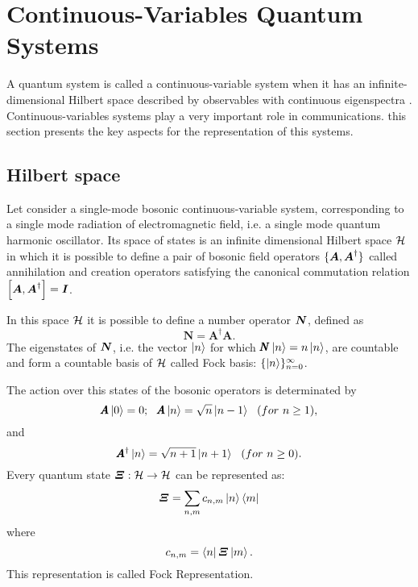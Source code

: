 \section{Continuous-Variables Quantum Systems}
    A quantum system is called a continuous-variable system
    when it has an infinite-dimensional Hilbert space described
    by observables with continuous eigenspectra \cite{ContinuousVar}.
    Continuous-variables systems play a very important role in communications. this
    section presents the key aspects for the representation of this systems.
            
    \subsection{Hilbert space}
        Let consider a single-mode bosonic continuous-variable system, corresponding to a single
        mode radiation of electromagnetic field, i.e. a single mode quantum harmonic oscillator.
        Its space of states is an infinite dimensional Hilbert space $\mathcal{H}$ in which it is possible to define
        a pair of bosonic field operators $\{ \bm{\relax{A}},\bm{\relax{A}}^{\dagger}\}$ called annihilation
        and creation operators \cite{ContinuousVar} satisfying the canonical commutation relation 
        $\commutator{\Operator{A}}{\Operator{A}^\dagger}= \Operator{I}$.

        In this space $\mathcal{H}$ it is possible to define a number operator $\bm{\relax{N}}$, defined as
        \begin{equation}
            \pmb{N}=\pmb{A}^\dagger \pmb{A}.
        \end{equation}
        The eigenstates of $\bm{\relax{N}}$, i.e. the vector $\ket{n}$ for which
        $\pmb{N}\ket{n}=n\ket{n}$,
        are countable and form a countable basis of $\mathcal{H}$ called
        Fock basis: $\{\ket{n}\}_{n=0}^\infty$.

        The action over this states of the bosonic operators is determinated by \cite{ContinuousVar}
        \begin{equation}
            \pmb{A}\ket{0}=0;\ \ \pmb{A}\ket{n}=\sqrt{n}\ket{n-1}\ \ (for\ n \geq 1),
        \end{equation}
        and
        \begin{equation*}
            \pmb{A}^\dagger\ket{n}=\sqrt{n+1}\ket{n+1}\ \ (for\ n \geq 0).
        \end{equation*}
        Every quantum state $\bm{\relax{\varXi}}:\mathcal{H}\to\mathcal{H}$ can be represented as:
        \begin{equation}
            \bm{\relax{\varXi}}=\sum_{n,m} c_{n,m} \ket{n}\bra{m}
            \label{eq:FockRep}
        \end{equation}
        where
        \begin{equation}
            c_{n,m}=\bra{n}\bm{\relax{\varXi}}\ket{m}.
        \end{equation}
        This representation is called Fock Representation.
        
